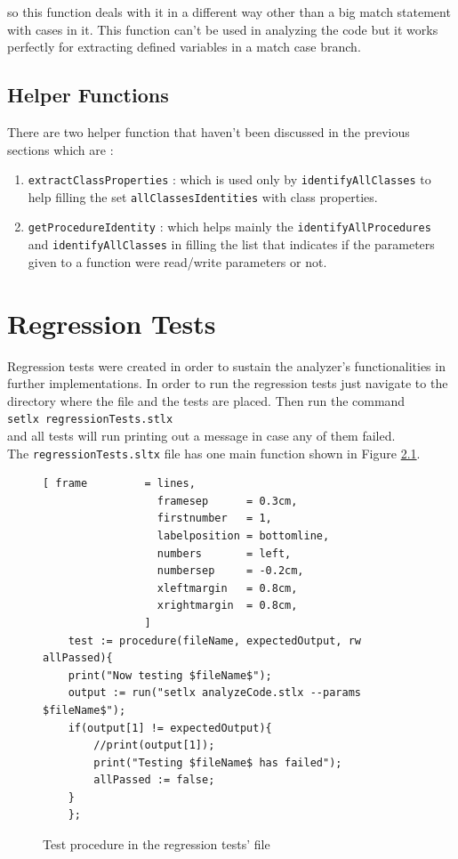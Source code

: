 \documentclass[11pt]{report}
\begin{document}
so this function deals with it in a different way other than a big match statement with cases in it. This function can't be used in analyzing the code but it works perfectly for extracting defined variables in a match case branch.

\section{Helper Functions}
There are two helper function that haven't been discussed in the previous sections which are :

\begin{enumerate}
\item \texttt{extractClassProperties} : which is used only by \texttt{identifyAllClasses} to help filling the set \texttt{allClassesIdentities} with class properties.

\item \texttt{getProcedureIdentity} : which helps mainly the \texttt{identifyAllProcedures} and \texttt{identifyAllClasses} in filling the list that indicates if the parameters given to a function were read/write parameters or not.
\end{enumerate}



\chapter{Regression Tests}

Regression tests were created in order to sustain the analyzer's functionalities in further implementations. In order to run the regression tests just navigate to the directory where the file and the tests are placed. Then run the command
\\[0.2cm]
\hspace*{0.6cm}
\texttt{setlx regressionTests.stlx}
\\[0.2cm]
and all tests will run printing out a message in case any of them failed.
\\

The \texttt{regressionTests.sltx} file has one main function shown in Figure \ref{fig:regressionTests.stlx}.

\begin{figure}[!ht]
\centering
\begin{Verbatim}[ frame         = lines, 
                  framesep      = 0.3cm, 
                  firstnumber   = 1,
                  labelposition = bottomline,
                  numbers       = left,
                  numbersep     = -0.2cm,
                  xleftmargin   = 0.8cm,
                  xrightmargin  = 0.8cm,
                ]
    test := procedure(fileName, expectedOutput, rw allPassed){
	print("Now testing $fileName$");
	output := run("setlx analyzeCode.stlx --params $fileName$");
	if(output[1] != expectedOutput){
		//print(output[1]);
		print("Testing $fileName$ has failed");
		allPassed := false;
	}
    };
\end{Verbatim}
\vspace*{-0.3cm}
\caption{Test procedure in the regression tests' file}
\label{fig:regressionTests.stlx}
\end{figure}
\end{document}
